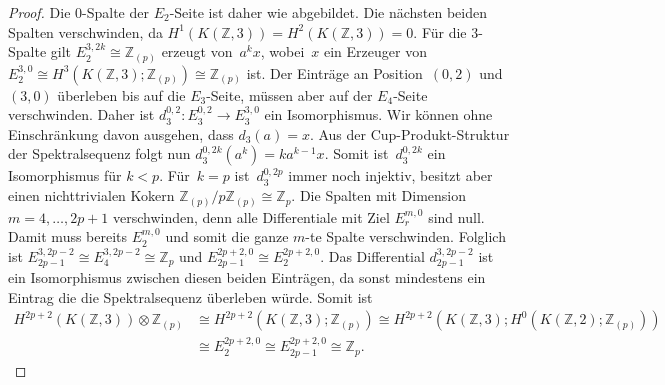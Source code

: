 \documentclass[11pt, a4paper, german]{article}
\theoremstyle{definition}
\theoremstyle{remark}
\newcommand{\Z}{\mathbb{Z}} %
\begin{document}
\begin{proof}
  Die $0$-Spalte der $E_2$-Seite ist daher wie abgebildet.
  Die nächsten beiden Spalten verschwinden, da $H^1(K(\Z, 3)) = H^2(K(\Z, 3)) = 0$. Für die $3$-Spalte gilt $E_2^{3,2k} \cong \Z_{(p)}$ erzeugt von~$a^k x$, wobei~$x$ ein Erzeuger von $E_2^{3,0} \cong H^3(K(\Z, 3); \Z_{(p)}) \cong \Z_{(p)}$ ist.
  Der Einträge an Position~$(0, 2)$ und~$(3, 0)$ überleben bis auf die $E_3$-Seite, müssen aber auf der $E_4$-Seite verschwinden.
  Daher ist $d_3^{0,2} : E_3^{0,2} \to E_3^{3,0}$ ein Isomorphismus.
  Wir können ohne Einschränkung davon ausgehen, dass $d_3(a) = x$.
  Aus der Cup-Produkt-Struktur der Spektralsequenz folgt nun $d_3^{0,2k}(a^k) = k a^{k-1} x$.
  Somit ist~$d_3^{0,2k}$ ein Isomorphismus für $k < p$.
  Für~$k = p$ ist~$d_3^{0,2p}$ immer noch injektiv, besitzt aber einen nichttrivialen Kokern $\Z_{(p)} / p \Z_{(p)} \cong \Z_p$.
  Die Spalten mit Dimension $m = 4, \ldots, 2p+1$ verschwinden, denn alle Differentiale mit Ziel $E_r^{m,0}$ sind null.
  Damit muss bereits $E_2^{m,0}$ und somit die ganze $m$-te Spalte verschwinden.
  Folglich ist $E_{2p-1}^{3,2p-2} \cong E_4^{3,2p-2} \cong \Z_p$ und $E_{2p-1}^{2p+2,0} \cong E_2^{2p+2,0}$.
  Das Differential $d_{2p-1}^{3,2p-2}$ ist ein Isomorphismus zwischen diesen beiden Einträgen, da sonst mindestens ein Eintrag die die Spektralsequenz überleben würde.
  Somit ist
  \begin{align*}
    H^{2p+2}(K(\Z, 3)) \otimes \Z_{(p)} & \cong H^{2p+2}(K(\Z, 3); \Z_{(p)}) \cong H^{2p+2}(K(\Z, 3); H^0(K(\Z, 2); \Z_{(p)})) \\
    & \cong E_2^{2p+2,0} \cong E_{2p-1}^{2p+2,0} \cong \Z_p.
  \end{align*}
  

\end{proof}
\end{document}

